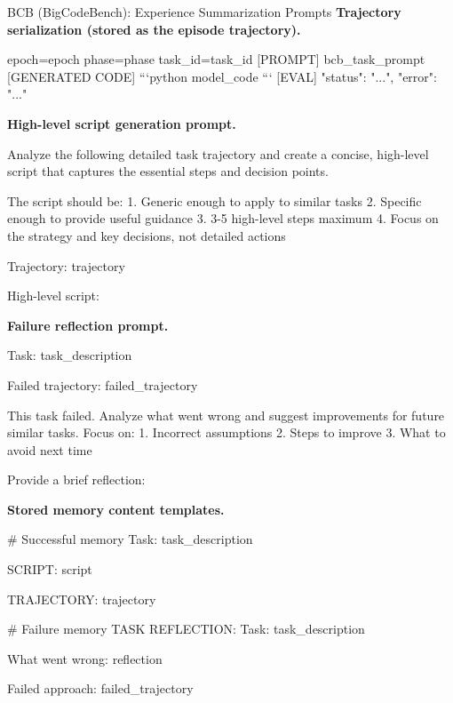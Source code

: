 \documentclass{article}
\theoremstyle{plain}
\theoremstyle{definition}
\theoremstyle{remark}
\begin{document}
\begin{PromptBox}{BCB (BigCodeBench): Experience Summarization Prompts}
\textbf{Trajectory serialization (stored as the episode trajectory).}
\begin{PromptCode}
[BCB] epoch={epoch} phase={phase} task_id={task_id}
[PROMPT]
{bcb_task_prompt}
[GENERATED CODE]
```python
{model_code}
```
[EVAL]
{"status": "...", "error": "..."}
\end{PromptCode}
\medskip
\textbf{High-level script generation prompt.}
\begin{PromptCode}
Analyze the following detailed task trajectory and create a concise,
high-level script that captures the essential steps and decision points.

The script should be:
1. Generic enough to apply to similar tasks
2. Specific enough to provide useful guidance
3. 3-5 high-level steps maximum
4. Focus on the strategy and key decisions, not detailed actions

Trajectory:
{trajectory}

High-level script:
\end{PromptCode}
\medskip
\textbf{Failure reflection prompt.}
\begin{PromptCode}
Task: {task_description}

Failed trajectory:
{failed_trajectory}

This task failed. Analyze what went wrong and suggest improvements for future similar tasks.
Focus on:
1. Incorrect assumptions
2. Steps to improve
3. What to avoid next time

Provide a brief reflection:
\end{PromptCode}
\medskip
\textbf{Stored memory content templates.}
\begin{PromptCode}
# Successful memory
Task: {task_description}

SCRIPT:
{script}

TRAJECTORY:
{trajectory}

# Failure memory
TASK REFLECTION:
Task: {task_description}

What went wrong:
{reflection}

Failed approach:
{failed_trajectory}
\end{PromptCode}
\end{PromptBox}
\medskip
\end{document}
